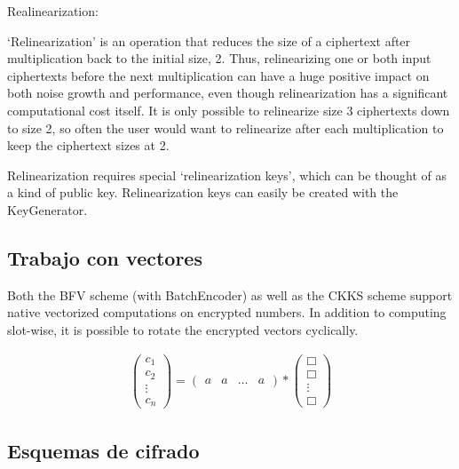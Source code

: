 Realinearization:

`Relinearization' is an operation that reduces the size of a ciphertext after
multiplication back to the initial size, 2. Thus, relinearizing one or both
input ciphertexts before the next multiplication can have a huge positive
impact on both noise growth and performance, even though relinearization has
a significant computational cost itself. It is only possible to relinearize
size 3 ciphertexts down to size 2, so often the user would want to relinearize
after each multiplication to keep the ciphertext sizes at 2.

Relinearization requires special `relinearization keys', which can be thought
of as a kind of public key. Relinearization keys can easily be created with
the KeyGenerator.


\subsection{Trabajo con vectores}

Both the BFV scheme (with BatchEncoder) as well as the CKKS scheme support native
vectorized computations on encrypted numbers. In addition to computing slot-wise,
it is possible to rotate the encrypted vectors cyclically.

    
    \begin{gather}
        \begin{pmatrix}
            c_1 \\
            c_2 \\
            \vdots{} \\
            c_n
        \end{pmatrix} 
        = 
        \begin{pmatrix}
            a & a & \hdots{} &  a
        \end{pmatrix}
         *
        \begin{pmatrix}
            \Box \\
            \Box \\
            \vdots{} \\
            \Box
        \end{pmatrix}
    \end{gather}

\subsection{Esquemas de cifrado}

